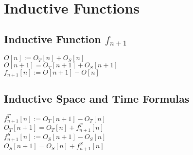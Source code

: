 \documentclass[11pt]{article}
\begin{document}
\newpage
\section{Inductive Functions}














\subsection{Inductive Function $f_{n+1}$}
\begin{center}
\vspace{2mm}
$
O[n] := O_T[n] + O_S[n]
$
\\ \vspace{2mm}
$
O[n+1] = O_T[n+1] + O_S[n+1]
$
\\ \vspace{4mm}
$
f_{n+1}[n] := O[n+1] - O[n]
$
\end{center}










\subsection{Inductive Space and Time Formulas}
\begin{center}
$
f^T_{n+1}[n] := O_T[n+1] - O_T[n]
$
\\ \vspace{2mm}
$
O_T[n+1] = O_T[n] + f^T_{n+1}[n]
$
\\ \vspace{2mm}
$
f^S_{n+1}[n] := O_S[n+1] - O_S[n]
$
\\ \vspace{2mm}
$
O_S[n+1] = O_S[n] + f^S_{n+1}[n]
$

\end{center}





\end{document}
